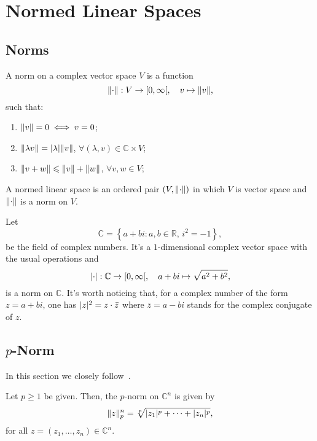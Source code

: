\section{Normed Linear Spaces}\label{sec:normed-linear-spaces}


\subsection{Norms}\label{subsec:norms}


\begin{definition}\label{def:normed-linear-spaces}
  A norm on a complex vector space \(V\) is a function
  \[
    \norm{\cdot}:V\to\rinterval{0}{\infty},\quad{v\mapsto\norm{v}},
  \]
  such that:
  \begin{enumerate}
    \item
      \(\lVert v\rVert=0\iff{v=0}\);
    \item
      \(\lVert\lambda{v}\rVert=\lvert\lambda\rvert\lVert v\rVert\), \(\forall(\lambda,v)\in{\mathbb{C}\times{V}}\);
    \item
      \(\lVert v+w\rVert\leqslant{\lVert v\rVert+\lVert w\rVert}\), \(\forall{v,w\in{V}}\);
  \end{enumerate}
  A normed linear space is an ordered pair \((V,\lVert\cdot\rVert)\) in which \(V\) is vector space and \(\lVert\cdot\rVert\) is a norm on \(V\).
\end{definition}

\begin{example}\label{the-complex-field-is-a-normed-linear-space}
  Let
  \[
    \mathbb{C}=\left\{a+bi:a,b\in\mathbb{R},\,i^{2}=-1\right\},
  \]
  be the field of complex numbers. It's a \(1\)-dimensional complex vector
  space with the usual operations and
  \[
    \abs{\cdot}:\mathbb{C}\to\rinterval{0}{\infty},\quad
    a+bi\mapsto\sqrt{a^{2}+b^{2}},
  \]
  is a norm on \(\mathbb{C}\). It's worth noticing that, for a complex number
  of the form \(z=a+bi\), one has \(\lvert z\rvert^{2}=z\cdot{\bar{z}}\) where
  \(\bar{z}=a-bi\) stands for the complex conjugate of \(z\).
\end{example}


\subsection{\(p\)-Norm}\label{subsec:p-norm}

In this section we closely follow~\cite{yet_another_proof_of_minkowskis_inequality}.

\begin{definition}
  Let \(p\geqslant{1}\) be given. Then, the \(p\)-norm on \(\mathbb{C}^{n}\)
  is given by
  \[
    \lVert z\rVert^{n}_{p}
    =
    \sqrt[p]{\lvert z_{1}\rvert^{p}+\cdots+\lvert z_{n}\rvert^{p}},
  \]
  for all \(z=(z_{1},\ldots,z_{n})\in\mathbb{C}^{n}\).
\end{definition}

